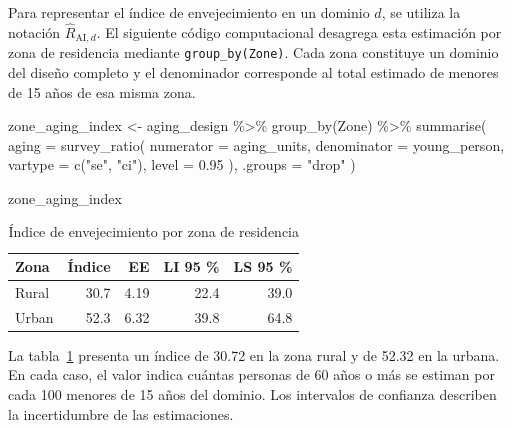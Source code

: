 \documentclass[
  spanish,
  11pt,
  letterpaper,
  oneside,
  open=any]{scrbook}
\newenvironment{Shaded}{\begin{snugshade}}{\end{snugshade}}
\newcommand{\AttributeTok}[1]{\textcolor[rgb]{0.40,0.45,0.13}{#1}}
\newcommand{\FloatTok}[1]{\textcolor[rgb]{0.68,0.00,0.00}{#1}}
\newcommand{\FunctionTok}[1]{\textcolor[rgb]{0.28,0.35,0.67}{#1}}
\newcommand{\NormalTok}[1]{\textcolor[rgb]{0.00,0.23,0.31}{#1}}
\newcommand{\OtherTok}[1]{\textcolor[rgb]{0.00,0.23,0.31}{#1}}
\newcommand{\SpecialCharTok}[1]{\textcolor[rgb]{0.37,0.37,0.37}{#1}}
\newcommand{\StringTok}[1]{\textcolor[rgb]{0.13,0.47,0.30}{#1}}
\begin{document}
Para representar el índice de envejecimiento en un dominio \(d\), se
utiliza la notación \(\hat R_{\mathrm{AI},d}\). El siguiente código
computacional desagrega esta estimación por zona de residencia mediante
\texttt{group\_by(Zone)}. Cada zona constituye un dominio del diseño
completo y el denominador corresponde al total estimado de menores de 15
años de esa misma zona.

\begin{Shaded}
\begin{Highlighting}[]
\NormalTok{zone\_aging\_index }\OtherTok{\textless{}{-}}\NormalTok{ aging\_design }\SpecialCharTok{\%\textgreater{}\%}
  \FunctionTok{group\_by}\NormalTok{(Zone) }\SpecialCharTok{\%\textgreater{}\%}
  \FunctionTok{summarise}\NormalTok{(}
    \AttributeTok{aging =} \FunctionTok{survey\_ratio}\NormalTok{(}
      \AttributeTok{numerator =}\NormalTok{ aging\_units,}
      \AttributeTok{denominator =}\NormalTok{ young\_person,}
      \AttributeTok{vartype =} \FunctionTok{c}\NormalTok{(}\StringTok{"se"}\NormalTok{, }\StringTok{"ci"}\NormalTok{),}
      \AttributeTok{level =} \FloatTok{0.95}
\NormalTok{    ),}
    \AttributeTok{.groups =} \StringTok{"drop"}
\NormalTok{  )}

\NormalTok{zone\_aging\_index}
\end{Highlighting}
\end{Shaded}

{

\begin{longtable}[]{@{}lrrrr@{}}

\caption{\label{tbl-indice-envejecimiento-zona}Índice de envejecimiento
por zona de residencia}

\tabularnewline

\toprule\noalign{}
Zona & Índice & EE & LI 95 \% & LS 95 \% \\
\midrule\noalign{}
\endhead
\bottomrule\noalign{}
\endlastfoot
Rural & 30.7 & 4.19 & 22.4 & 39.0 \\
Urban & 52.3 & 6.32 & 39.8 & 64.8 \\

\end{longtable}

}

La tabla~\ref{tbl-indice-envejecimiento-zona} presenta un índice de
30.72 en la zona rural y de 52.32 en la urbana. En cada caso, el valor
indica cuántas personas de 60 años o más se estiman por cada 100 menores
de 15 años del dominio. Los intervalos de confianza describen la
incertidumbre de las estimaciones.
\end{document}
